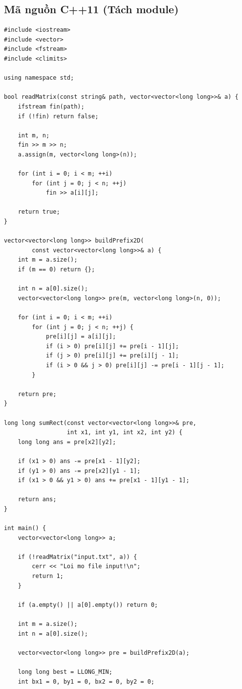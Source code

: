 \subsection{Mã nguồn C++11 (Tách module)}
\begin{lstlisting}
#include <iostream>
#include <vector>
#include <fstream>
#include <climits>

using namespace std;

bool readMatrix(const string& path, vector<vector<long long>>& a) {
    ifstream fin(path);
    if (!fin) return false;

    int m, n;
    fin >> m >> n;
    a.assign(m, vector<long long>(n));

    for (int i = 0; i < m; ++i)
        for (int j = 0; j < n; ++j)
            fin >> a[i][j];

    return true;
}

vector<vector<long long>> buildPrefix2D(
        const vector<vector<long long>>& a) {
    int m = a.size();
    if (m == 0) return {};

    int n = a[0].size();
    vector<vector<long long>> pre(m, vector<long long>(n, 0));

    for (int i = 0; i < m; ++i)
        for (int j = 0; j < n; ++j) {
            pre[i][j] = a[i][j];
            if (i > 0) pre[i][j] += pre[i - 1][j];
            if (j > 0) pre[i][j] += pre[i][j - 1];
            if (i > 0 && j > 0) pre[i][j] -= pre[i - 1][j - 1];
        }

    return pre;
}

long long sumRect(const vector<vector<long long>>& pre,
                  int x1, int y1, int x2, int y2) {
    long long ans = pre[x2][y2];

    if (x1 > 0) ans -= pre[x1 - 1][y2];
    if (y1 > 0) ans -= pre[x2][y1 - 1];
    if (x1 > 0 && y1 > 0) ans += pre[x1 - 1][y1 - 1];

    return ans;
}

int main() {
    vector<vector<long long>> a;

    if (!readMatrix("input.txt", a)) {
        cerr << "Loi mo file input!\n";
        return 1;
    }

    if (a.empty() || a[0].empty()) return 0;

    int m = a.size();
    int n = a[0].size();

    vector<vector<long long>> pre = buildPrefix2D(a);

    long long best = LLONG_MIN;
    int bx1 = 0, by1 = 0, bx2 = 0, by2 = 0;


\end{lstlisting}
